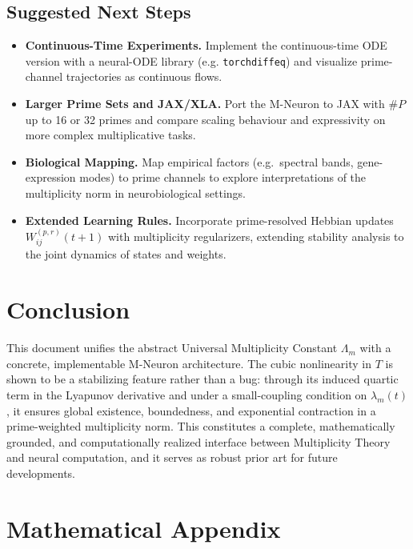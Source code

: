 \documentclass[11pt]{article}
\begin{document}
\subsection{Suggested Next Steps}

\begin{itemize}[leftmargin=*]
  \item \textbf{Continuous-Time Experiments.}
  Implement the continuous-time ODE version with a neural-ODE library (e.g. \texttt{torchdiffeq}) and visualize prime-channel trajectories as continuous flows.

  \item \textbf{Larger Prime Sets and JAX/XLA.}
  Port the M-Neuron to JAX with \(\#P\) up to 16 or 32 primes and compare scaling behaviour and expressivity on more complex multiplicative tasks.

  \item \textbf{Biological Mapping.}
  Map empirical factors (e.g.\ spectral bands, gene-expression modes) to prime channels to explore interpretations of the multiplicity norm in neurobiological settings.

  \item \textbf{Extended Learning Rules.}
  Incorporate prime-resolved Hebbian updates \(W_{ij}^{(p,r)}(t+1)\) with multiplicity regularizers, extending stability analysis to the joint dynamics of states and weights.
\end{itemize}

\section*{Conclusion}

This document unifies the abstract Universal Multiplicity Constant \(\Lambda_m\) with a concrete, implementable M-Neuron architecture. The cubic nonlinearity in \(T\) is shown to be a stabilizing feature rather than a bug: through its induced quartic term in the Lyapunov derivative and under a small-coupling condition on \(\lambda_m(t)\), it ensures global existence, boundedness, and exponential contraction in a prime-weighted multiplicity norm. This constitutes a complete, mathematically grounded, and computationally realized interface between Multiplicity Theory and neural computation, and it serves as robust prior art for future developments.

\appendix
\section*{Mathematical Appendix}
\end{document}
